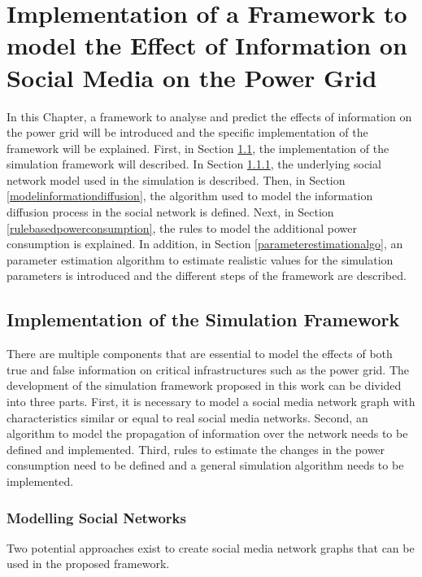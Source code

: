 \chapter{Implementation of a Framework to model the Effect
of Information on Social Media on the Power Grid}

In this Chapter, a framework to analyse and predict 
the effects of information on the 
power grid will be introduced and the specific implementation of the 
framework will be explained.
First, in Section \ref{simulationframeworksection}, 
the implementation of the simulation framework will described.
In Section \ref{modelsocialnetwork}, the underlying social network model
used in the simulation is described. Then, in Section 
\ref{modelinformationdiffusion}, the algorithm used to model
the information diffusion process in the social network is 
defined. Next, in Section \ref{rulebasedpowerconsumption}, 
the rules to model the additional power consumption is explained.
In addition, in Section \ref{parameterestimationalgo},
an parameter estimation algorithm to estimate realistic 
values for the simulation parameters is introduced and 
the different steps of the framework are described.

\section{Implementation of the Simulation Framework}
\label{simulationframeworksection}
There are multiple components that are essential to model the effects of 
both true and false information on critical infrastructures
such as the power grid. The development of the simulation framework
proposed in this work can be divided into three parts. First, it is 
necessary to model a social media network graph with characteristics similar 
or equal to
real social media networks. Second, an algorithm to model the 
propagation of information over the network needs to be defined and 
implemented. Third, rules to estimate the changes in the power consumption 
need to be defined and a general simulation algorithm needs to be implemented.

\subsection{Modelling Social Networks}
\label{modelsocialnetwork}
Two potential approaches exist to create social media network graphs 
that can be used in the proposed framework.

